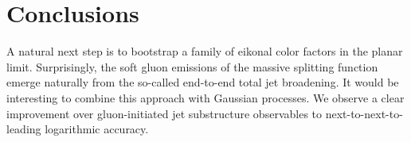 \section{Conclusions}\label{sec:conclusions}

A natural next step is to bootstrap a family of eikonal color factors in
the planar limit. Surprisingly, the soft gluon emissions of the massive
splitting function emerge naturally from the so-called end-to-end total
jet broadening. It would be interesting to combine this approach with
Gaussian processes. We observe a clear improvement over gluon-initiated
jet substructure observables to next-to-next-to-leading logarithmic
accuracy.

